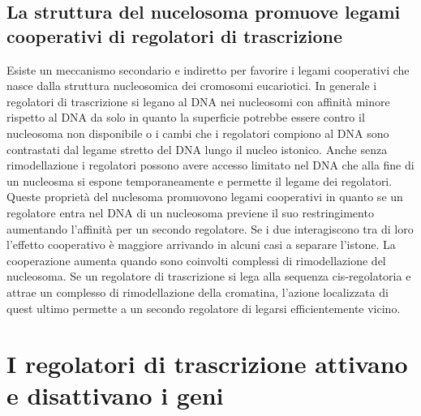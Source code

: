 \subsection{La struttura del nucelosoma promuove legami cooperativi di regolatori di trascrizione}
Esiste un meccanismo secondario e indiretto per favorire i legami cooperativi che nasce dalla struttura nucleosomica dei cromosomi eucariotici. In generale i regolatori di trascrizione
si legano al DNA nei nucleosomi con affinit\`a minore rispetto al DNA da solo in quanto la superficie potrebbe essere contro il nucleosoma non disponibile o i cambi che i regolatori 
compiono al DNA sono contrastati dal legame stretto del DNA lungo il nucleo istonico. Anche senza rimodellazione i regolatori possono avere accesso limitato nel DNA che alla fine di 
un nucleosma si espone temporaneamente e permette il legame dei regolatori. Queste propriet\`a del nuclesoma promuovono legami cooperativi in quanto se un regolatore entra nel DNA di 
un nucleosoma previene il suo restringimento aumentando l'affinit\`a per un secondo regolatore. Se i due interagiscono tra di loro l'effetto cooperativo \`e maggiore arrivando in 
alcuni casi a separare l'istone. La cooperazione aumenta quando sono coinvolti complessi di rimodellazione del nucleosoma. Se un regolatore di trascrizione si lega alla sequenza 
cis-regolatoria e attrae un complesso di rimodellazione della cromatina, l'azione localizzata di quest ultimo permette a un secondo regolatore di legarsi efficientemente vicino. 
\section{I regolatori di trascrizione attivano e disattivano i geni}
